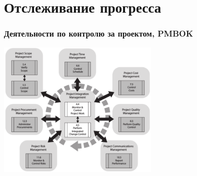 \documentclass{../../slides-style}
\begin{document}
    \section{Отслеживание прогресса}

    \begin{frame}
        \frametitle{Деятельности по контролю за проектом, PMBOK}
        \begin{center}
            \includegraphics[width=0.6\textwidth]{pmbokProjectManagement.png}
        \end{center}
    \end{frame}
\end{document}
